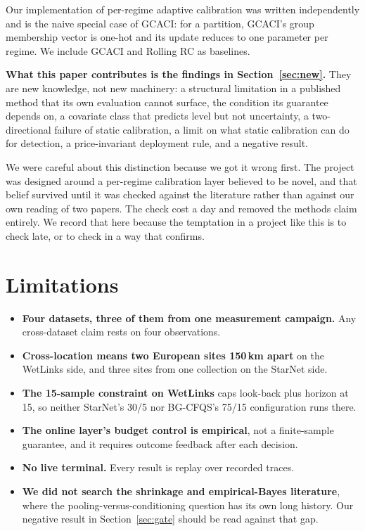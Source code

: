 \documentclass[acmsmall,screen]{acmart}
\begin{document}
Our implementation of per-regime adaptive calibration was written independently and is the naive special case of GCACI: for a partition, GCACI's group membership vector is one-hot and its update reduces to one parameter per regime. We include GCACI and Rolling RC as baselines.

\textbf{What this paper contributes is the findings in Section~\ref{sec:new}.} They are new knowledge, not new machinery: a structural limitation in a published method that its own evaluation cannot surface, the condition its guarantee depends on, a covariate class that predicts level but not uncertainty, a two-directional failure of static calibration, a limit on what static calibration can do for detection, a price-invariant deployment rule, and a negative result.

We were careful about this distinction because we got it wrong first. The project was designed around a per-regime calibration layer believed to be novel, and that belief survived until it was checked against the literature rather than against our own reading of two papers. The check cost a day and removed the methods claim entirely. We record that here because the temptation in a project like this is to check late, or to check in a way that confirms.

\section{Limitations}

\begin{itemize}
\item \textbf{Four datasets, three of them from one measurement campaign.} Any cross-dataset claim rests on four observations.
\item \textbf{Cross-location means two European sites 150\,km apart} on the WetLinks side, and three sites from one collection on the StarNet side.
\item \textbf{The 15-sample constraint on WetLinks} caps look-back plus horizon at 15, so neither StarNet's 30/5 nor BG-CFQS's 75/15 configuration runs there.
\item \textbf{The online layer's budget control is empirical}, not a finite-sample guarantee, and it requires outcome feedback after each decision.
\item \textbf{No live terminal.} Every result is replay over recorded traces.
\item \textbf{We did not search the shrinkage and empirical-Bayes literature}, where the pooling-versus-conditioning question has its own long history. Our negative result in Section~\ref{sec:gate} should be read against that gap.
\end{itemize}
\end{document}
